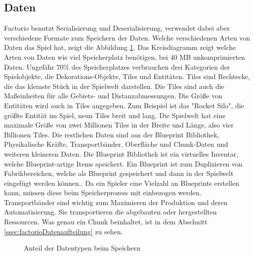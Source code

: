 \subsection{Daten}
Factorio benutzt Serialisierung und Deserialisierung, verwendet dabei aber verschiedene Formate zum Speichern der Daten. Welche verschiedenen Arten von Daten das Spiel hat, zeigt die Abbildung \ref{fig:factorioSaveStatistic}. Das Kreisdiagramm zeigt welche Arten von Daten wie viel Speicherplatz benötigen, bei 40 MB unkomprimierten Daten. Ungefähr 70\% des Speicherplatzes verbrauchen drei Kategorien der Spielobjekte, die Dekorations-Objekte, Tiles und Entitäten. Tiles sind Rechtecke, die das kleinste Stück in der Spielwelt darstellen. Die Tiles sind auch die Maßeinheiten für alle Gebiets- und Distanzabmessungen. Die Größe von Entitäten wird auch in Tiles angegeben. Zum Beispiel ist das "Rocket Silo", die größte Entität im Spiel, neun Tiles breit und lang. Die Spielwelt hat eine maximale Größe von zwei Millionen Tiles in der Breite und Länge, also vier Billionen Tiles.\cite{factorioMapStructure} Die restlichen Daten sind aus der Blueprint Bibliothek, Physikalische Kräfte, Transportbänder, Oberfläche und Chunk-Daten und weiteren kleineren Daten.\cite{factorioFridayFacts270} Die Blueprint Bibliothek ist ein virtuelles Inventar, welche Blueprint-artige Items speichert.\cite{factorioBlueprintLibrary} Ein Blueprint ist zum Duplizieren von Fabrikbereichen, welche als Blueprint gespeichert und dann in der Spielwelt eingefügt werden können.\cite{factorioBlueprint}. Da ein Spieler eine Vielzahl an Blueprints erstellen kann, müssen diese beim Speicherprozess mit einbezogen werden. Transportbänder sind wichtig zum Maximieren der Produktion und deren Automatisierung. Sie transportieren die abgebauten oder hergestellten Ressourcen. Was genau ein Chunk beinhaltet, ist in dem Abschnitt \ref{ssec:factorioDatenaufteilung} zu sehen.


\begin{figure}[htp]
    \centering
    \caption{Anteil der Datentypen beim Speichern\cite{factorioFridayFacts270}}
    \label{fig:factorioSaveStatistic}
\end{figure}




